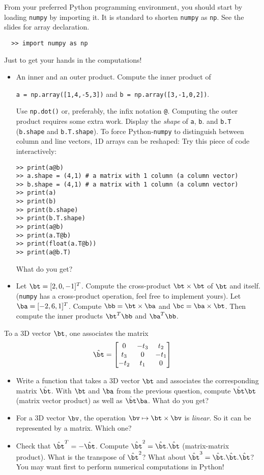 \documentclass[a4paper,10pt]{article}
\newcommand{\numpy}{\texttt{numpy}}
\begin{document}
From your preferred Python programming environment, you should start by loading \texttt{numpy} by importing it. It is standard to shorten \texttt{numpy} as \texttt{np}.
See the slides for array declaration.
\begin{verbatim}
  >> import numpy as np
\end{verbatim}
Just to get your hands in the computations! 
\begin{itemize}
  \item An inner and an outer product.  Compute the inner product of
   \begin{center}
     \texttt{a = np.array([1,4,-5,3])} and \texttt{b = np.array([3,-1,0,2])}.
   \end{center}
   Use \texttt{np.dot()} or, preferably, the infix notation \texttt{@}. Computing the outer product requires some extra work. Display the \emph{shape} of \texttt{a}, \texttt{b}.
   and \texttt{b.T} (\texttt{b.shape} and \texttt{b.T.shape}). To force Python-\numpy{} to distinguish between column and line vectors, 1D arrays can be reshaped: Try this piece of code interactively:
   \vspace{-3mm}
   \begin{verbatim}
>> print(a@b)
>> a.shape = (4,1) # a matrix with 1 column (a column vector)
>> b.shape = (4,1) # a matrix with 1 column (a column vector)
>> print(a)
>> print(b)
>> print(b.shape)
>> print(b.T.shape)
>> print(a@b)
>> print(a.T@b)
>> print(float(a.T@b))
>> print(a@b.T)
   \end{verbatim}\vspace{-6mm}
  What do you get?
  \item Let $\bt = [2,0,-1]^T$. Compute the cross-product $\bt\times \bt$ of $\bt$ and itself. (\numpy{} has a cross-product operation, feel free to implement yours).
  Let $\ba = [-2,6,1]^T$. Compute $\bb = \bt\times \ba$ and $\bc = \ba\times \bt$. Then compute the inner products $\bt^T\bb$ and $\ba^T \bb$. 
\end{itemize}  
To a 3D vector $\bt$, one associates the matrix
$$
\hat{\bt} = \begin{bmatrix}
  0 & -t_3 & t_2\\
  t_3& 0 & -t_1\\
  -t_2 & t_1 & 0
\end{bmatrix}
$$
\begin{itemize}
  \item Write a function that takes a 3D vector $\bt$ and associates the corresponding matrix $\hat{\bt}$.
    With $\bt$ and $\ba$ from the previous question, compute $\hat{\bt}\bt$ (matrix vector product) as well as $\hat{\bt}\ba$. What do you get? 
  \item For a 3D vector $\bv$, the operation $\bv\mapsto \bt\times \bv$ is \emph{linear}. So it can be represented by a matrix. Which one? 
  \item Check that $\hat{\bt}^T = -\hat{\bt}$. Compute  $\hat{\bt}^2 = \hat{\bt}.\hat{\bt}$ (matrix-matrix product). What is the transpose of $\hat{\bt}^2$? What about $\hat{\bt}^3 = \hat{\bt}.\hat{\bt}.\hat{\bt}$?
  You may want first to perform numerical computations in Python! 
\end{itemize}
\end{document}
